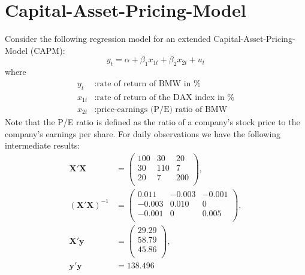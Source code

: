\documentclass{article}
\begin{document}
\section{Capital-Asset-Pricing-Model}
Consider the following regression model for an extended Capital-Asset-Pricing-Model (CAPM):
$$y_t = \alpha + \beta_1 x_{1t} + \beta_2 x_{2t} + u_t$$
where
\begin{align*}
	y_t&: \text{rate of return of BMW in \%}\\
	x_{1t}&: \text{rate of return of the DAX index in \%}\\
	x_{2t}&: \text{price-earnings (P/E) ratio of BMW}
\end{align*}
Note that the P/E ratio is defined as the ratio of a company's stock price to the company's earnings per share. For daily observations we have the following intermediate results:
\begin{align*}
\mathbf{X}'\mathbf{X} &= 
\begin{pmatrix}
100  & 30 & 20\\
30 & 110 & 7\\
20 & 7 & 200\\
\end{pmatrix}, \\
(\mathbf{X}'\mathbf{X})^{-1} &= 
\begin{pmatrix}
0.011  & -0.003 & -0.001\\
-0.003 & 0.010 & 0\\
-0.001 & 0 & 0.005\\
\end{pmatrix},\\
\mathbf{X}'\mathbf{y}&= 
\begin{pmatrix}
29.29\\
58.79\\
45.86\\
\end{pmatrix},\\
\mathbf{y}'\mathbf{y} &= 138.496
\end{align*}
\end{document}
